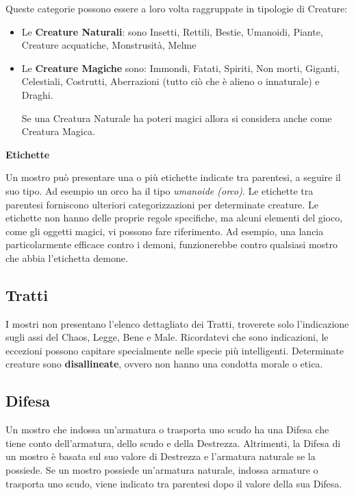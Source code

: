 \begin{multicols}{2}
\medskip

Queste categorie possono essere a loro volta raggruppate in tipologie di Creature:
\smallskip
\begin{itemize}
\item
Le \textbf{Creature Naturali}: sono Insetti, Rettili, Bestie, Umanoidi, Piante, Creature acquatiche, Monstrusità, Melme
\item
Le \textbf{Creature Magiche} sono: Immondi, Fatati, Spiriti, Non morti, Giganti, Celestiali, Costrutti, Aberrazioni (tutto ciò che è alieno o innaturale) e Draghi.

Se una Creatura Naturale ha poteri magici allora si considera anche come Creatura Magica.
\end{itemize}


\medskip\textbf{Etichette}

Un mostro può presentare una o più etichette indicate tra parentesi, a seguire il suo tipo. Ad esempio un orco ha il tipo \textit{umanoide (orco)}. Le etichette tra parentesi forniscono ulteriori categorizzazioni per determinate creature. Le etichette non hanno delle proprie regole specifiche, ma alcuni elementi del gioco, come gli oggetti magici, vi possono fare riferimento. Ad esempio, una lancia particolarmente efficace contro i demoni, funzionerebbe contro qualsiasi mostro che abbia l'etichetta demone.

\subsection{Tratti}

I mostri non presentano l'elenco dettagliato dei Tratti, troverete solo l'indicazione sugli assi del Chaos, Legge, Bene e Male. Ricordatevi che sono indicazioni, le eccezioni possono capitare specialmente nelle specie più intelligenti.
Determinate creature sono \textbf{disallineate}, ovvero non hanno una condotta morale o etica.

\subsection{Difesa}

Un mostro che indossa un'armatura o trasporta uno scudo ha una Difesa che tiene conto dell'armatura, dello scudo e della Destrezza. Altrimenti, la Difesa di un mostro è basata sul suo valore di Destrezza e l'armatura naturale se la possiede. Se un mostro possiede un'armatura naturale, indossa armature o trasporta uno scudo, viene indicato tra parentesi dopo il valore della sua Difesa.


\end{multicols}
